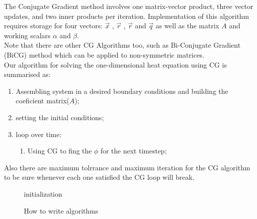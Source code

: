 The Conjugate Gradient method involves one matrix-vector product, three vector updates, and two inner products per iteration. Implementation of this algorithm requires storage for four vectors: $\vec{x}$ , $\vec{r}$ , $\vec{r}$ and $\vec{q}$ as well as the matrix $A$ and working scalars $\alpha$ and $\beta$. 
\\
Note that there are other CG Algorithms too, such as Bi-Conjugate Gradient (BiCG) method which can be applied to non-symmetric matrices.
\\
Our algorithm for solving the one-dimensional heat equation using CG is summarised as:
\begin{enumerate} %
\item Assembling system in a desired boundary conditions and building the coeficient matrix($A$);
\item setting the initial conditions;
\item loop over time:
	\begin{enumerate}
		\item Using CG to fing the $\phi$ for the next timestep;
	\end{enumerate}
\end{enumerate}
Also there are maximum tolrrance and maximum iteration for the CG algorithm to be sure whenever each one satisfied the CG loop will break.


\begin{figure}[ht]
  \centering
  \begin{minipage}{.7\linewidth}
    \begin{algorithm}[H]
      \SetAlgoLined
      initialization\;
      \caption{How to write algorithms}
    \end{algorithm}
  \end{minipage}
\end{figure}

%